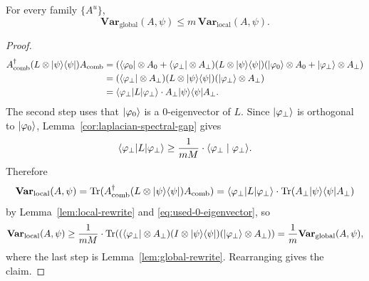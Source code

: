 \begin{lemma}\label{lem:local-to-global}
	\leanok
	For every family $\{A^u\}$,
	\[
		\mathbf{Var}_{\mathrm{global}}(A,\psi) \le m\, \mathbf{Var}_{\mathrm{local}}(A,\psi).
	\]
\end{lemma}
\begin{proof}
	\leanok
	\begin{equation}
		\begin{aligned}
			A_{\mathrm{comb}}^\dagger (L \otimes \lvert \psi \rangle\langle \psi \rvert) A_{\mathrm{comb}}
			 & =
			(\langle \varphi_0 \rvert\otimes A_0+\langle \varphi_\perp \rvert\otimes A_\perp)(L \otimes \lvert \psi \rangle\langle \psi \rvert)(\lvert \varphi_0 \rangle\otimes A_0+\lvert \varphi_\perp \rangle\otimes A_\perp) \\
			 & =
			(\langle \varphi_\perp \rvert\otimes A_\perp)(L \otimes \lvert \psi \rangle\langle \psi \rvert)(\lvert \varphi_\perp \rangle\otimes A_\perp)                                               \\
			 & =
			\langle \varphi_\perp \rvert L\lvert \varphi_\perp \rangle \cdot A_\perp \lvert \psi \rangle\langle \psi \rvert A_\perp.
		\end{aligned}
		\label{eq:used-0-eigenvector}
	\end{equation}
	The second step uses that $\lvert \varphi_0 \rangle$ is a $0$-eigenvector of $L$. Since $\lvert \varphi_\perp \rangle$ is orthogonal to $\lvert \varphi_0 \rangle$, Lemma~\ref{cor:laplacian-spectral-gap} gives
	\[
		\langle \varphi_\perp \rvert L\lvert \varphi_\perp \rangle
		\ge
		\frac{1}{mM} \cdot \langle \varphi_\perp \mid \varphi_\perp \rangle.
	\]
	Therefore
	\[
		\mathbf{Var}_{\mathrm{local}}(A,\psi)
		=
		\operatorname{Tr}(A_{\mathrm{comb}}^\dagger (L \otimes \lvert \psi \rangle\langle \psi \rvert) A_{\mathrm{comb}})
		=
		\langle \varphi_\perp \rvert L\lvert \varphi_\perp \rangle \cdot \operatorname{Tr}(A_\perp \lvert \psi \rangle\langle \psi \rvert A_\perp)
	\]
	by Lemma~\ref{lem:local-rewrite} and \eqref{eq:used-0-eigenvector}, so
	\[
		\mathbf{Var}_{\mathrm{local}}(A,\psi)
		\ge
		\frac{1}{mM} \cdot \operatorname{Tr}((\langle \varphi_\perp \rvert\otimes A_\perp)(I\otimes \lvert \psi \rangle\langle \psi \rvert)(\lvert \varphi_\perp \rangle\otimes A_\perp))
		=
		\frac{1}{m}\mathbf{Var}_{\mathrm{global}}(A,\psi),
	\]
	where the last step is Lemma~\ref{lem:global-rewrite}. Rearranging gives the claim.
\end{proof}
